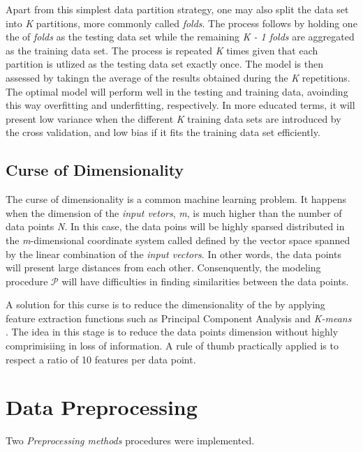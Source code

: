 Apart from this simplest data partition strategy, one may also split the data set
into \textit{K} partitions, more commonly called \textit{folds}. The process follows
by holding one the of \textit{folds} as the testing data set while the remaining
\textit{K - 1 folds} are aggregated as the training data set. The process is
repeated \textit{K} times given that each partition is utlized as the testing data
set exactly once. The model is then assessed by takingn the average of the results
obtained during the \textit{K} repetitions. The optimal model will perform well
in the testing and training data, avoinding this way overfitting and underfitting,
respectively. In more educated terms, it will present low variance when the
different \textit{K} training data sets are introduced by the cross validation, and
low bias if it fits the training data set efficiently.


\subsection{Curse of Dimensionality}

The curse of dimensionality is a common machine learning problem. It happens when
the dimension of the \textit{input vetors}, \textit{m}, is much higher than the
number of data points \textit{N}. In this case, the data poins will be highly sparsed
distributed in the \textit{m}-dimensional coordinate system called defined by the
vector space spanned by the linear combination of the \textit{input vectors}.
In other words, the data points will present large distances from each other.
Consenquently, the modeling procedure $\mathcal{P}$ will have difficulties in
finding similarities between the data points.

A solution for this curse is to reduce the dimensionality of the by applying feature
extraction functions such as Principal Component Analysis and \textit{K-means} \cite{lecturenotes}. The idea in this
stage is to reduce the data points dimension without highly comprimisiing in loss of
information. A rule of thumb practically applied is to respect a ratio of 10 features
per data point.

\section{Data Preprocessing}

Two \textit{Preprocessing methods} procedures were implemented.


